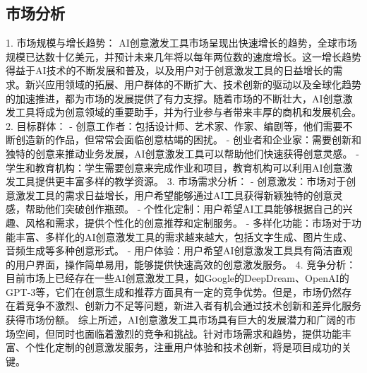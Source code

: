 \subsection{市场分析}
1. 市场规模与增长趋势：
AI创意激发工具市场呈现出快速增长的趋势，全球市场规模已达数十亿美元，并预计未来几年将以每年两位数的速度增长。这一增长趋势得益于AI技术的不断发展和普及，以及用户对于创意激发工具的日益增长的需求。新兴应用领域的拓展、用户群体的不断扩大、技术创新的驱动以及全球化趋势的加速推进，都为市场的发展提供了有力支撑。随着市场的不断壮大，AI创意激发工具将成为创意领域的重要助手，并为行业参与者带来丰厚的商机和发展机会。
2. 目标群体：
- 创意工作者：包括设计师、艺术家、作家、编剧等，他们需要不断创造新的作品，但常常会面临创意枯竭的困扰。
- 创业者和企业家：需要创新和独特的创意来推动业务发展，AI创意激发工具可以帮助他们快速获得创意灵感。
- 学生和教育机构：学生需要创意来完成作业和项目，教育机构可以利用AI创意激发工具提供更丰富多样的教学资源。
3. 市场需求分析：
- 创意激发：市场对于创意激发工具的需求日益增长，用户希望能够通过AI工具获得新颖独特的创意灵感，帮助他们突破创作瓶颈。
- 个性化定制：用户希望AI工具能够根据自己的兴趣、风格和需求，提供个性化的创意推荐和定制服务。
- 多样化功能：市场对于功能丰富、多样化的AI创意激发工具的需求越来越大，包括文字生成、图片生成、音频生成等多种创意形式。
- 用户体验：用户希望AI创意激发工具具有简洁直观的用户界面，操作简单易用，能够提供快速高效的创意激发服务。
4. 竞争分析：
目前市场上已经存在一些AI创意激发工具，如Google的DeepDream、OpenAI的GPT-3等，它们在创意生成和推荐方面具有一定的竞争优势。但是，市场仍然存在着竞争不激烈、创新力不足等问题，新进入者有机会通过技术创新和差异化服务获得市场份额。
综上所述，AI创意激发工具市场具有巨大的发展潜力和广阔的市场空间，但同时也面临着激烈的竞争和挑战。针对市场需求和趋势，提供功能丰富、个性化定制的创意激发服务，注重用户体验和技术创新，将是项目成功的关键。

